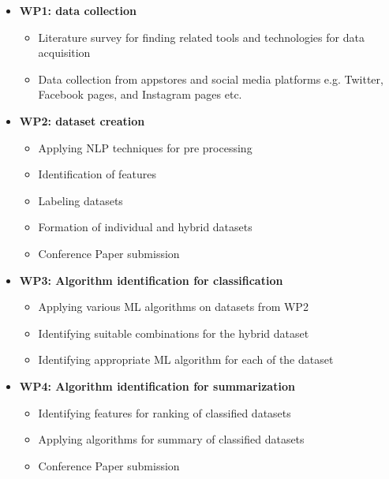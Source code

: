 \begin{itemize}
\item{\textbf{ WP1: data collection}}
\begin{itemize}
\item{ Literature survey for finding related tools and technologies for data acquisition}
\item{ Data collection from appstores and social media platforms e.g. Twitter, Facebook pages, and Instagram pages etc.\\}
\end{itemize}

\item{\textbf{ WP2: dataset creation}}
\begin{itemize}
\item{ Applying NLP techniques for pre processing}
\item{ Identification of features}
\item{ Labeling datasets}
\item{ Formation of individual and hybrid datasets\\}
\item{ Conference Paper submission\\}
\end{itemize}

\item{\textbf{ WP3: Algorithm identification for classification}}
\begin{itemize}
\item{ Applying various ML algorithms on datasets from WP2}
\item{ Identifying suitable combinations for the hybrid dataset}
\item{ Identifying appropriate ML algorithm for each of the dataset\\}
\end{itemize}

\item{\textbf{ WP4: Algorithm identification for summarization}}
\begin{itemize}\item{ Identifying features for ranking of classified datasets}
\item{ Applying algorithms for summary of classified datasets}
\item{ Conference Paper submission\\}
\end{itemize}


\end{itemize}
